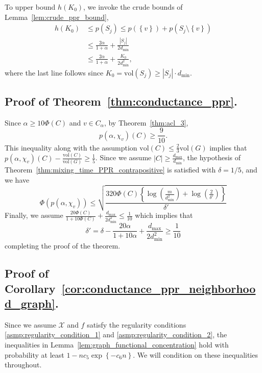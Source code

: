 \documentclass{article}
\newcommand{\abs}[1]{\left \lvert #1 \right \rvert}
\newcommand{\vol}{\mathrm{vol}}
\newcommand{\set}[1]{\left\{#1\right\}}
\newcommand{\1}{\mathbf{1}}
\theoremstyle{alden}
\theoremstyle{aldenthm}
\theoremstyle{remark}
\begin{document}
To upper bound $h(K_0)$, we invoke the crude bounds of Lemma~\ref{lem:crude_ppr_bound},
\begin{align*}
h(K_0) & \leq p(S_j) \leq p(\set{v}) + p(S_j \setminus \set{v}) \\
& \leq \frac{2\alpha}{1 + \alpha} + \frac{\abs{S_j}}{2d_{\min}} \\
& \leq \frac{2\alpha}{1 + \alpha} + \frac{K_0}{2d_{\min}^2},
\end{align*}
where the last line follows since $K_0 = \vol(S_j) \geq \abs{S_j}\cdot d_{\min}$.

\subsection{Proof of Theorem~\ref{thm:conductance_ppr}.}
Since $\alpha \geq 10\Phi(C)$ and $v \in C_{\alpha}$, by Theorem~\ref{thm:acl_3},
\begin{equation*}
p(\alpha,\chi_v)(C) \geq \frac{9}{10}.
\end{equation*}
This inequality along with the assumption $\vol(C) \leq \frac{2}{3}\vol(G)$ implies that $p(\alpha,\chi_v)(C) - \frac{\vol(C)}{\vol(G)} \geq \frac{1}{5}$. Since we assume $\abs{C} \geq \frac{d_{\max}}{d_{\min}}$, the hypothesis of Theorem~\ref{thm:mixing_time_PPR_contrapositive} is satisfied with $\delta = 1/5$, and we have
\begin{equation*}
\Phi(p(\alpha,\chi_v)) \leq \sqrt{\frac{320\Phi(C)\left\{\log\left(\frac{m}{d_{\min}^2}\right) + \log\left(\frac{2}{\delta'}\right)\right\}}{\delta'}}
\end{equation*}
Finally, we assume $\frac{20\Phi(C)}{1 + 10\Phi(C)} + \frac{d_{\max}}{2d_{\min}^2} \leq \frac{1}{10}$ which implies that
\begin{equation*}
\delta' = \delta - \frac{20\alpha}{1 + 10\alpha} + \frac{d_{\max}}{2d_{\min}^2} \geq \frac{1}{10} 
\end{equation*}
completing the proof of the theorem.

\subsection{Proof of Corollary~\ref{cor:conductance_ppr_neighborhood_graph}.}

Since we assume $\mathcal{X}$ and $f$ satisfy the regularity conditions \ref{asmp:regularity_condition_1} and \ref{asmp:regularity_condition_2}, the inequalities in Lemma~\ref{lem:graph_functional_concentration} hold with probability at least $1 - n c_5 \exp\set{-c_6n}$. We will condition on these inequalities throughout.
\end{document}
